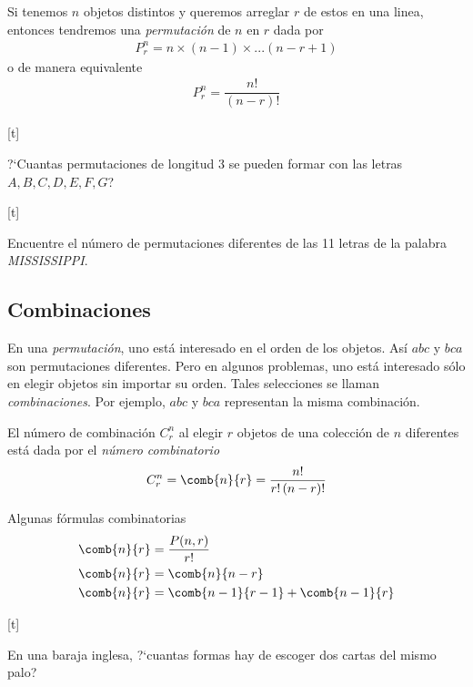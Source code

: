 {}
 Si tenemos $n$ objetos distintos y queremos arreglar $r$ de estos en una linea, entonces tendremos una \emph{permutación} de $n$ en $r$ dada por
 \begin{align}
  \label{1.25}
  P^{n}_{r}=n\times(n-1)\times...\left( n-r+1 \right)
 \end{align} 
o de manera equivalente
\begin{align}
 \label{1.27}
 P^{n}_{r}=\dfrac{n!}{(n-r)!}
\end{align}


[t]{}
\begin{ejemplo}
 \label{exmp:1.16}
 ?`Cuantas permutaciones de longitud 3 se pueden formar con las letras $A,B,C,D,E,F,G$?
\end{ejemplo}


[t]{}
\begin{ejemplo}
 \label{exmp:1.17}
 Encuentre el número de permutaciones diferentes de las 11 letras de la palabra \emph{MISSISSIPPI}.
\end{ejemplo}


\subsection{Combinaciones}
{}
En una \emph{permutación}, uno está interesado en el orden de los objetos. Así $abc$ y $bca$ son permutaciones diferentes.  Pero en algunos problemas, uno está interesado sólo en elegir objetos sin importar su orden.  Tales selecciones se llaman \emph{combinaciones}.  Por ejemplo, $abc$ y $bca$ representan la misma combinación.



 El número de combinación $ C^{n}_{r} $ al elegir $r$ objetos de una colección de $n$ diferentes está dada por el \emph{número combinatorio}
  \begin{align}
   \label{1.29}
  C^{n}_{r} = \comb{n}{r}=\dfrac{n!}{r!\left( n-r \right)!}
  \end{align}



{Algunas fórmulas combinatorias}
\begin{align}
 \label{1.30}
 \comb{n}{r}&=\dfrac{P(n,r)}{r!} \\
 \label{1.31}
 \comb{n}{r}&=\comb{n}{n-r}\\
 \comb{n}{r}&=\comb{n-1}{r-1}+\comb{n-1}{r}
\end{align}


[t]{}
\begin{ejemplo}
 \label{exmp:1.18}
 En una baraja inglesa, ?`cuantas formas hay de escoger dos cartas del mismo palo?
\end{ejemplo}


